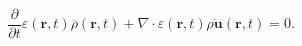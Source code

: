 \begin{equation}
\frac{\partial}{\partial t}\varepsilon (\mathbf{r},t) \overline{\rho}(\mathbf{r},t) +
\nabla \cdot \varepsilon (\mathbf{r},t) \overline{\rho
\mathbf{u}}(\mathbf{r},t)  = 0.
 \label{eq:continuity}
\end{equation}

